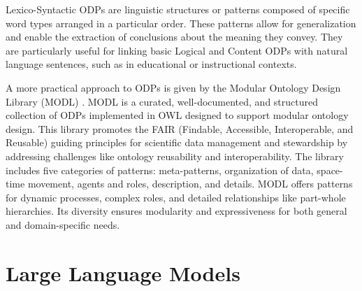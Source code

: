 Lexico-Syntactic ODPs are linguistic structures or patterns composed of specific word types arranged in a particular order.
These patterns allow for generalization and enable the extraction of conclusions about the meaning they convey.
They are particularly useful for linking basic Logical and Content ODPs with natural language sentences, such as in educational or instructional contexts.

A more practical approach to ODPs is given by the Modular Ontology Design Library (MODL) \cite{shimizu2019modl}.
MODL is a curated, well-documented, and structured collection of ODPs implemented in OWL designed to support modular ontology design.
This library promotes the FAIR (Findable, Accessible, Interoperable, and Reusable) guiding principles for scientific data management and stewardship by addressing challenges like ontology reusability and interoperability.
The library includes five categories of patterns: meta-patterns, organization of data, space-time movement, agents and roles, description, and details.
MODL offers patterns for dynamic processes, complex roles, and detailed relationships like part-whole hierarchies.
Its diversity ensures modularity and expressiveness for both general and domain-specific needs.

\section{Large Language Models}
\label{section:2_3_llms}

